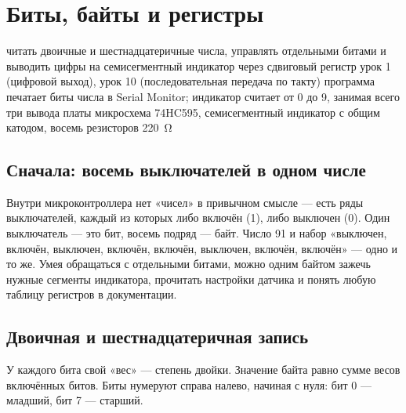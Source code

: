 \section{Биты, байты и регистры}
\lessonintro
  {читать двоичные и шестнадцатеричные числа, управлять отдельными битами и выводить цифры на семисегментный индикатор через сдвиговый регистр}
  {урок 1 (цифровой выход), урок 10 (последовательная передача по такту)}
  {программа печатает биты числа в Serial Monitor; индикатор считает от 0 до 9, занимая всего три вывода платы}
  {микросхема 74HC595, семисегментный индикатор с общим катодом, восемь резисторов \SI{220}{\ohm}}

\subsection{Сначала: восемь выключателей в одном числе}

Внутри микроконтроллера нет «чисел» в привычном смысле --- есть ряды выключателей, каждый из которых
либо включён (1), либо выключен (0). Один выключатель --- это бит, восемь подряд --- байт. Число 91
и набор «выключен, включён, выключен, включён, включён, выключен, включён, включён» --- одно и то же.
Умея обращаться с отдельными битами, можно одним байтом зажечь нужные сегменты индикатора, прочитать
настройки датчика и понять любую таблицу регистров в документации.

\subsection{Двоичная и шестнадцатеричная запись}

У каждого бита свой «вес» --- степень двойки. Значение байта равно сумме весов включённых битов. Биты
нумеруют справа налево, начиная с нуля: бит 0 --- младший, бит 7 --- старший.

